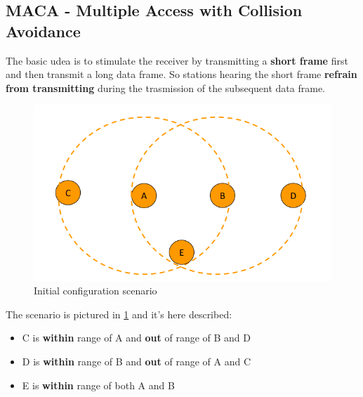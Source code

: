 \documentclass[10pt,a4paper]{report}
\theoremstyle{definition}
\begin{document}
\subsection{MACA - Multiple Access with Collision Avoidance}\label{sec:maca---multiple-access-with-collision-avoidance}
The basic udea is to stimulate the receiver by transmitting a \textbf{short frame} first and then transmit a long data frame. So stations hearing the short frame \textbf{refrain from transmitting} during the trasmission of the subsequent data frame.
\begin{figure}[h!]
	\centering\includegraphics[scale=0.50]{images/Pasted image 20230225101254.png}
	\caption{Initial configuration scenario}
	\label{maca-proto}
\end{figure}


The scenario is pictured in \ref{maca-proto} and it's here described:
\begin{itemize}
	\item 
	C is \textbf{within} range of A and \textbf{out} of range of B and D
	\item 
	D is \textbf{within} range of B and \textbf{out} of range of A and C
	\item 
	E is \textbf{within} range of both A and B
\end{itemize}
\end{document}
